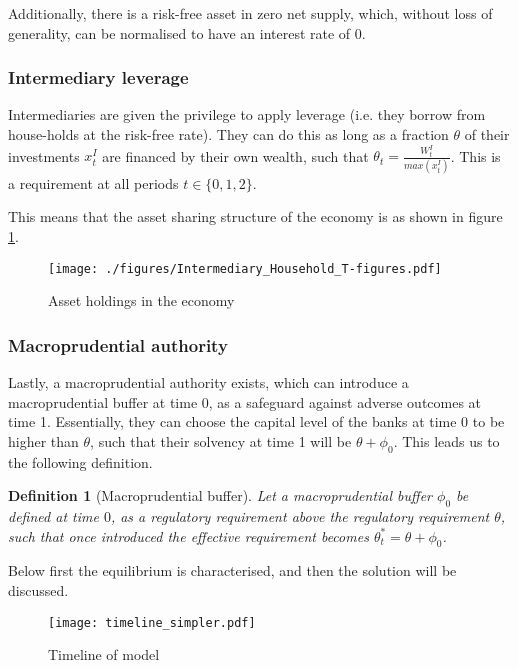 \documentclass[11pt]{article}
\newtheorem{definition}{Definition}%
\begin{document}
Additionally, there is a risk-free asset in zero net supply, which, without loss of generality, can be normalised to have an interest rate of 0.

\subsubsection*{Intermediary leverage}
Intermediaries are given the privilege to apply leverage (i.e. they borrow from house-holds at the risk-free rate). They can do this as long as a fraction $\theta$ of their investments $x^I_t$ are financed by their own wealth, such that $\theta_t = \frac{W^I_t}{max(x^{I}_t)}$. This is a requirement at all periods $t\in \{0,1,2\}$. 

This means that the asset sharing structure of the economy is as shown in figure \ref{fig:t-figure}.
\begin{figure}[h]
\centering
\texttt{[image: ./figures/Intermediary\_Household\_T-figures.pdf]}
\caption{Asset holdings in the economy\\
}
\label{fig:t-figure}
\end{figure}

\subsubsection*{Macroprudential authority}
Lastly, a macroprudential authority exists, which can introduce a macroprudential buffer at time 0, as a safeguard against adverse outcomes at time 1. Essentially, they can choose the capital level of the banks at time 0 to be higher than $\theta$, such that their solvency at time 1 will be $\theta + \phi_0$. This leads us to the following definition.


\begin{definition}[Macroprudential buffer]
Let a macroprudential buffer $\phi_0$ be defined at time $0$, as a regulatory requirement above the regulatory requirement $\theta$, such that once introduced the effective requirement becomes $\theta^*_t = \theta + \phi_0$.
\end{definition}


Below first the equilibrium is characterised, and then the solution will be discussed.

\begin{figure}[h]
\centering
\texttt{[image: timeline\_simpler.pdf]}
\caption{Timeline of model\\
}
\label{fig:timeline}
\end{figure}
\end{document}
